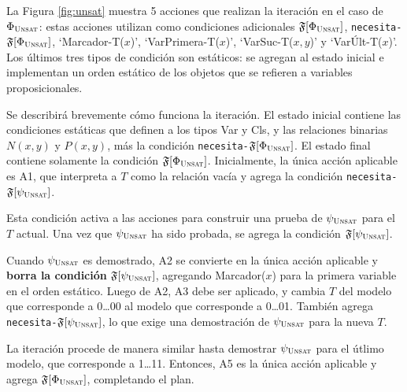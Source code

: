 La Figura \ref{fig:unsat} muestra 5 acciones que realizan la iteración en el
caso de $\Phi_{\textsc{Unsat}}$: estas
acciones utilizan como condiciones adicionales $\mathfrak{F}[\Phi_{\textsc{Unsat}}]$,
\texttt{necesita-}$\mathfrak{F}[\Phi_{\textsc{Unsat}}]$, `Marcador-T($x$)', `VarPrimera-T($x$)',
`VarSuc-T($x,y$)' y `VarÚlt-T($x$)'. Los últimos tres tipos de condición son
estáticos: se agregan al estado inicial e implementan un orden estático de los
objetos que se refieren a variables proposicionales.

Se describirá brevemente cómo funciona la iteración.
El estado inicial contiene las condiciones estáticas que definen a los tipos
Var y Cls, y las relaciones binarias 
$N(x,y)$ y $P(x,y)$, más la condición
\texttt{necesita-}$\mathfrak{F}[\Phi_{\textsc{Unsat}}]$. El estado final contiene solamente la
condición $\mathfrak{F}[\Phi_{\textsc{Unsat}}]$.
Inicialmente, la única acción aplicable es A1, que interpreta a $T$ como la
relación vacía y agrega la condición \texttt{necesita-}$\mathfrak{F}[\psi_{\textsc{Unsat}}]$.

Esta condición activa a las acciones para construir una prueba de $\psi_{\textsc{Unsat}}$
para el $T$ actual. Una vez que $\psi_{\textsc{Unsat}}$ ha sido probada, se agrega la
condición $\mathfrak{F}[\psi_{\textsc{Unsat}}]$.

Cuando $\psi_{\textsc{Unsat}}$ es demostrado, A2 se convierte en la única acción
aplicable y \textbf{borra la condición} $\mathfrak{F}[\psi_{\textsc{Unsat}}]$, agregando
Marcador($x$) para la primera variable en el orden estático.
Luego de A2, A3 debe ser aplicado, y cambia $T$ del modelo que corresponde a
0\ldots00 al modelo que corresponde a 0\ldots01. También agrega
\texttt{necesita-}$\mathfrak{F}[\psi_{\textsc{Unsat}}]$, lo que exige una demostración de
$\psi_{\textsc{Unsat}}$ para la nueva $T$.

La iteración procede de manera similar hasta demostrar $\psi_{\textsc{Unsat}}$ para el
útlimo modelo, que corresponde a 1\ldots11. Entonces, A5 es la única acción
aplicable y agrega $\mathfrak{F}[\Phi_{\textsc{Unsat}}]$, completando el plan.

